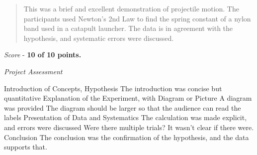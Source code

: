 \documentclass[10pt]{article}
\begin{document}
\maketitle

\begin{abstract}
This was a brief and excellent demonstration of projectile motion.  The participants used Newton's 2nd Law to find the spring constant of a nylon band used in a catapult launcher.  The data is in agreement with the hypothesis, and systematic errors were discussed.
\end{abstract}

\textit{Score} - \textbf{10 of 10 points.}

\textit{Project Assessment}
\begin{outline}[enumerate]
\1 Introduction of Concepts, Hypothesis
\2 The introduction was concise but quantitative
\1 Explanation of the Experiment, with Diagram or Picture
\2 A diagram was provided
\2 The diagram should be larger so that the audience can read the labels
\1 Presentation of Data and Systematics
\2 The calculation was made explicit, and errors were discussed
\2 Were there multiple trials?  It wasn't clear if there were.
\1 Conclusion
\2 The conclusion was the confirmation of the hypothesis, and the data supports that.
\end{outline}
\end{document}
